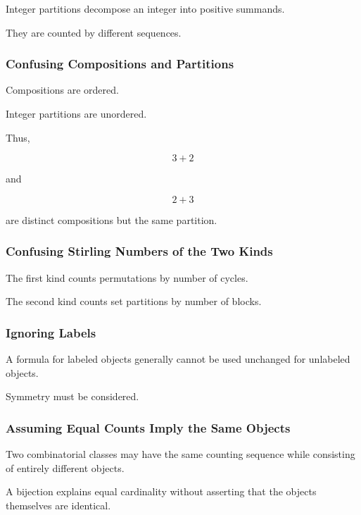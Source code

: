 Integer partitions decompose an integer into positive summands.

They are counted by different sequences.

\subsubsection{Confusing Compositions and Partitions}

Compositions are ordered.

Integer partitions are unordered.

Thus,

\[
3+2
\]

and

\[
2+3
\]

are distinct compositions but the same partition.

\subsubsection{Confusing Stirling Numbers of the Two Kinds}

The first kind counts permutations by number of cycles.

The second kind counts set partitions by number of blocks.

\subsubsection{Ignoring Labels}

A formula for labeled objects generally cannot be used unchanged for
unlabeled objects.

Symmetry must be considered.

\subsubsection{Assuming Equal Counts Imply the Same Objects}

Two combinatorial classes may have the same counting sequence while
consisting of entirely different objects.

A bijection explains equal cardinality without asserting that the
objects themselves are identical.

